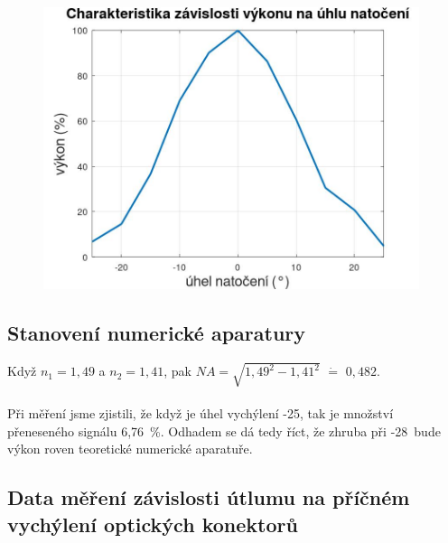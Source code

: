 \begin{figure}[h]
\centering
\includegraphics[width=11cm]{images/plot.jpg}
\caption{}
\label{fig:13}
\end{figure}

\newpage
\subsection{Stanovení numerické aparatury}

Když $n_1 = 1,49$ a $n_2 = 1,41$, pak $NA = \sqrt{1,49^2 - 1,41 ^ 2}$ $\dot{=}$ $0,482$.
\\\\
Při měření jsme zjistili, že když je úhel vychýlení -25\textdegree, tak je množství přeneseného signálu \mbox{6,76 \%}.
Odhadem se dá tedy říct, že zhruba při -28\textdegree \ bude výkon roven teoretické numerické aparatuře. 

\newpage
\subsection{Data měření závislosti útlumu na příčném vychýlení optických konektorů}

